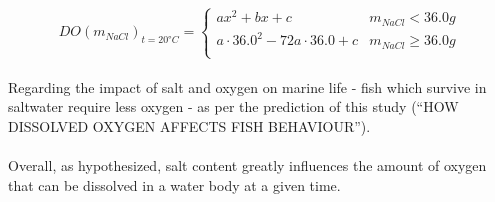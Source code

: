 \documentclass[a4paper]{article}
\begin{document}
$$DO(m_{NaCl})_{t = \si{20 \degree C}} = 
\begin{cases}
  a x^2 + b x + c & m_{NaCl} < 36.0 \si{g} \\
  a \cdot 36.0^2 - 72 a \cdot 36.0 + c & m_{NaCl} \geq 36.0 \si{g} \\
\end{cases}
$$

\paragraph*{}
Regarding the impact of salt and oxygen on marine life - fish which survive in
saltwater require less oxygen - as per the prediction of this study (``HOW
DISSOLVED OXYGEN AFFECTS FISH BEHAVIOUR'').

\paragraph*{}
Overall, as hypothesized, salt content greatly influences the amount of oxygen
that can be dissolved in a water body at a given time.

\singlespacing
\pagebreak
{}
\end{document}
